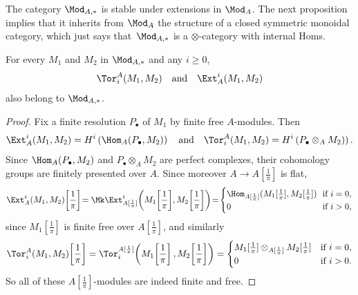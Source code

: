 The category $\Mod_{A,\ast}$ is stable under extensions in $\Mod_{A}$. The next proposition implies that it inherits from $\Mod_{A}$ the structure of a closed symmetric monoidal category, which just says that~$\Mod_{A,\ast}$ is a $\otimes$-category with internal Homs.
\begin{prop}
For every $M_{1}$ and $M_{2}$ in $\Mod_{A,\ast}$ and any $i\geq0$,
\[
\Tor_{i}^{A}(M_{1},M_{2})\quad\text{and}\quad\Ext_{A}^{i}(M_{1},M_{2})
\]
also belong to $\Mod_{A,\ast}$.
\end{prop}
\begin{proof}
Fix a finite resolution $P_{\bullet}$ of $M_{1}$ by finite free $A$-modules. Then
\[
\Ext_{A}^{i}(M_{1},M_{2})=H^{i}\left(\Hom_{A}(P_{\bullet},M_{2})\right)\quad\text{and}\quad\Tor_{i}^{A}(M_{1},M_{2})=H^{i}\left(P_{\bullet}\otimes_{A}M_{2})\right).
\]
Since $\Hom_{A}(P_{\bullet},M_{2})$ and $P_{\bullet}\otimes_{A}M_{2}$ are perfect complexes, their cohomology groups are finitely presented over $A$. Since moreover $A\rightarrow A[\frac{1}{\pi}]$ is flat,
\[
\Ext_{A}^{i}(M_{1},M_{2})\!\left[{\frac{1}{\pi}}\right]\!=\Mk\Ext_{A[{\frac{1}{\pi}}]}^{i}\!\left(M_{1}\!\left[{\frac{1}{\pi}}\right]\!,M_{2}\!\left[{\frac{1}{\pi}}\right]\right)\!=\!
\begin{cases}
\Hom_{A[{\frac{1}{\pi}}]}(M_{1}[{\frac{1}{\pi}}],M_{2}[{\frac{1}{\pi}}])\!\! & \text{if }i=0,\\
0 & \text{if }i>0,
\end{cases}
\]
since $M_{1}[{\frac{1}{\pi}}]$ is finite free over $A[{
\frac{1}{\pi}}]$, and similarly
\[
\Tor_{i}^{A}(M_{1},M_{2})\!\left[{\frac{1}{\pi}}\right]=\Tor_{i}^{A[{\frac{1}{\pi}}]}\!\left(M_{1}\!\left[{\frac{1}{\pi}}\right],M_{2}\!\left[{\frac{1}{\pi}}\right]\right)=
\begin{cases}
M_{1}[{\frac{1}{\pi}}]\otimes_{A[{\frac{1}{\pi}}]}M_{2}[{\frac{1}{\pi}}] & \text{if }i=0,\\
0 & \text{if }i>0.
\end{cases}
\]
So all of these $A[{\frac{1}{\pi}}]$-modules are indeed finite and free.
\end{proof}

\subsubsection{}\label{subsec:ModAtquasiab}

